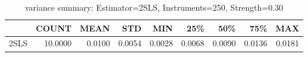 \begin{table}[ht]
\centering
\caption{variance summary: Estimator=2SLS, Instruments=250, Strength=0.30}
\begin{tabular}{lrrrrrrrr}
\toprule
 & COUNT & MEAN & STD & MIN & 25\% & 50\% & 75\% & MAX \\
\midrule
2SLS & 10.0000 & 0.0100 & 0.0054 & 0.0028 & 0.0068 & 0.0090 & 0.0136 & 0.0181 \\
\bottomrule
\end{tabular}
\end{table}
